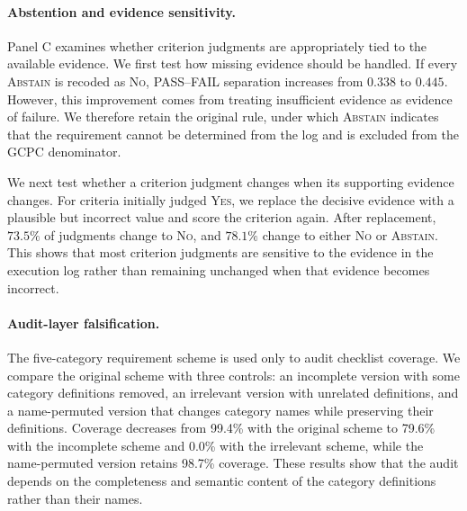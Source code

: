\documentclass[sigconf,nonacm]{acmart}
\newcommand{\abstain}{\textsc{Abstain}}
\begin{document}
\paragraph{Abstention and evidence sensitivity.}
Panel C examines whether criterion judgments are appropriately tied to the
available evidence. We first test how missing evidence should be handled.
If every \abstain{} is recoded as \textsc{No}, PASS--FAIL separation increases
from $0.338$ to $0.445$. However, this improvement comes from treating
insufficient evidence as evidence of failure. We therefore retain the original
rule, under which \abstain{} indicates that the requirement cannot be determined
from the log and is excluded from the GCPC denominator.

We next test whether a criterion judgment changes when its supporting evidence
changes. For criteria initially judged \textsc{Yes}, we replace the decisive
evidence with a plausible but incorrect value and score the criterion again.
After replacement, $73.5\%$ of judgments change to \textsc{No}, and $78.1\%$
change to either \textsc{No} or \abstain{}. This shows that most criterion
judgments are sensitive to the evidence in the execution log rather than
remaining unchanged when that evidence becomes incorrect.

\paragraph{Audit-layer falsification.}
The five-category requirement scheme is used only to audit checklist coverage. We compare the original scheme with three controls: an incomplete version with some category definitions removed, an irrelevant version with unrelated definitions, and a name-permuted version that changes category names while preserving their definitions. Coverage decreases from 99.4\% with the original scheme to 79.6\% with the incomplete scheme and 0.0\% with the irrelevant scheme, while the name-permuted version retains 98.7\% coverage. These results show that the audit depends on the completeness and semantic content of the category definitions rather than their names.

\end{document}
